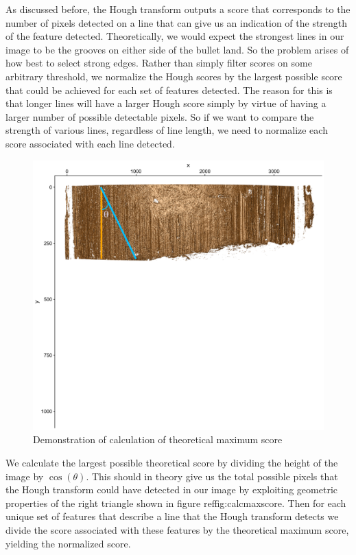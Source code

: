 \documentclass[12pt]{article}\usepackage[]{graphicx}\usepackage[]{color}
\newenvironment{knitrout}{}{} %
\theoremstyle{nonumberplain}
\begin{document}
As discussed before, the Hough transform outputs a score that corresponds to the number of pixels detected on a line that can give us an indication of the strength of the feature detected. Theoretically, we would expect the strongest lines in our image to be the grooves on either side of the bullet land. So the problem arises of how best to select strong edges. Rather than simply filter scores on some arbitrary threshold, we normalize the Hough scores by the largest possible score that could be achieved for each set of features detected. The reason for this is that longer lines will have a larger Hough score simply by virtue of having a larger number of possible detectable pixels. So if we want to compare the strength of various lines, regardless of line length, we need to normalize each score associated with each line detected.  



\begin{knitrout}
\color{fgcolor}\begin{figure}

{\centering \includegraphics[width=0.5\linewidth]{../images/calc-theoretical-max} 

}

\caption[Demonstration of calculation of theoretical maximum score]{Demonstration of calculation of theoretical maximum score}\label{fig:max-graphic-inclusion}
\end{figure}


\end{knitrout}


We calculate the largest possible theoretical score by dividing the height of the image by $\cos(\theta)$. This should in theory give us the total possible pixels that the Hough transform could have detected in our image by exploiting geometric properties of the right triangle shown in figure ref{fig:calcmaxscore}. Then for each unique set of features that describe a line that the Hough transform detects we divide the score associated with these features by the theoretical maximum score, yielding the normalized score. 
\end{document}
